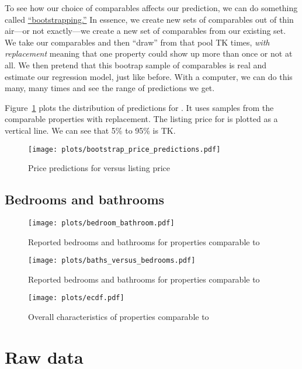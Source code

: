 \documentclass[
10pt, %
a4paper, %
oneside, %
headinclude,footinclude, %
BCOR5mm, %
]{scrartcl}
\begin{document}
To see how our choice of comparables affects our prediction, we can do something called \href{https://en.wikipedia.org/wiki/Bootstrapping_(statistics)}{``bootstrapping.''}
In essence, we create new sets of comparables out of thin air---or not exactly---we create a new set of comparables from our existing set. 
We take our comparables and then ``draw'' from that pool TK times, \emph{with replacement} meaning that one property could show up more than once or not at all.
We then pretend that this bootrap sample of comparables is real and estimate our regression model, just like before.
With a computer, we can do this many, many times and see the range of predictions we get. 

Figure~\ref{fig:bootstrap_price_predictions} plots the distribution of predictions for \PropertyName{}.
It uses samples from the comparable properties with replacement.
The listing price for \PropertyName{} is plotted as a vertical line. 
We can see that 5\% to 95\% is TK.

\begin{figure}
\centering
\caption{Price predictions for \PropertyName{} versus listing price} \label{fig:bootstrap_price_predictions}  
\texttt{[image: plots/bootstrap\_price\_predictions.pdf]} 
\end{figure}

\subsection{Bedrooms and bathrooms}

\begin{figure}
\centering
\caption{Reported bedrooms and bathrooms for properties comparable to \PropertyName{}} \label{fig:bedroom_bathroom}  
\texttt{[image: plots/bedroom\_bathroom.pdf]} 
\end{figure}

\begin{figure}
\centering
\caption{Reported bedrooms and bathrooms for properties comparable to \PropertyName{}} \label{fig:baths_versus_bedrooms}  
\texttt{[image: plots/baths\_versus\_bedrooms.pdf]} 
\end{figure}

\begin{figure}
\centering
\caption{Overall characteristics of properties comparable to \PropertyName{}} \label{fig:ecdf}  
\texttt{[image: plots/ecdf.pdf]} 
\end{figure}

\renewcommand{\refname}{\spacedlowsmallcaps{References}} %


\appendix
\section{Raw data} \label{sec:raw_data} 
\end{document}
